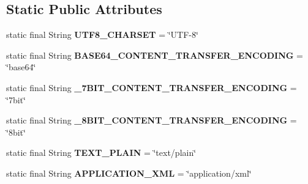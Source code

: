 \subsection*{Static Public Attributes}
\begin{DoxyCompactItemize}
\item 
\hypertarget{classcom_1_1bluevia_1_1commons_1_1connector_1_1http_1_1multipart_1_1BlueviaPartBase_a6745696aa3fdab490aaa07d41e857a38}{
static final String {\bfseries UTF8\_\-CHARSET} = \char`\"{}UTF-\/8\char`\"{}}
\label{classcom_1_1bluevia_1_1commons_1_1connector_1_1http_1_1multipart_1_1BlueviaPartBase_a6745696aa3fdab490aaa07d41e857a38}

\item 
\hypertarget{classcom_1_1bluevia_1_1commons_1_1connector_1_1http_1_1multipart_1_1BlueviaPartBase_a378bce7fc843d77f299ee8997fcafab0}{
static final String {\bfseries BASE64\_\-CONTENT\_\-TRANSFER\_\-ENCODING} = \char`\"{}base64\char`\"{}}
\label{classcom_1_1bluevia_1_1commons_1_1connector_1_1http_1_1multipart_1_1BlueviaPartBase_a378bce7fc843d77f299ee8997fcafab0}

\item 
\hypertarget{classcom_1_1bluevia_1_1commons_1_1connector_1_1http_1_1multipart_1_1BlueviaPartBase_a6ba5f6ddda8791126858dd69a561214b}{
static final String {\bfseries \_\-7BIT\_\-CONTENT\_\-TRANSFER\_\-ENCODING} = \char`\"{}7bit\char`\"{}}
\label{classcom_1_1bluevia_1_1commons_1_1connector_1_1http_1_1multipart_1_1BlueviaPartBase_a6ba5f6ddda8791126858dd69a561214b}

\item 
\hypertarget{classcom_1_1bluevia_1_1commons_1_1connector_1_1http_1_1multipart_1_1BlueviaPartBase_ac18b593e988cc09351b9f5f0c471fa1d}{
static final String {\bfseries \_\-8BIT\_\-CONTENT\_\-TRANSFER\_\-ENCODING} = \char`\"{}8bit\char`\"{}}
\label{classcom_1_1bluevia_1_1commons_1_1connector_1_1http_1_1multipart_1_1BlueviaPartBase_ac18b593e988cc09351b9f5f0c471fa1d}

\item 
\hypertarget{classcom_1_1bluevia_1_1commons_1_1connector_1_1http_1_1multipart_1_1BlueviaPartBase_a99a638b3e20671c3c18f2049f34464a4}{
static final String {\bfseries TEXT\_\-PLAIN} = \char`\"{}text/plain\char`\"{}}
\label{classcom_1_1bluevia_1_1commons_1_1connector_1_1http_1_1multipart_1_1BlueviaPartBase_a99a638b3e20671c3c18f2049f34464a4}

\item 
\hypertarget{classcom_1_1bluevia_1_1commons_1_1connector_1_1http_1_1multipart_1_1BlueviaPartBase_af374fff712455a015f18394cc906beed}{
static final String {\bfseries APPLICATION\_\-XML} = \char`\"{}application/xml\char`\"{}}
\label{classcom_1_1bluevia_1_1commons_1_1connector_1_1http_1_1multipart_1_1BlueviaPartBase_af374fff712455a015f18394cc906beed}


\end{DoxyCompactItemize}
